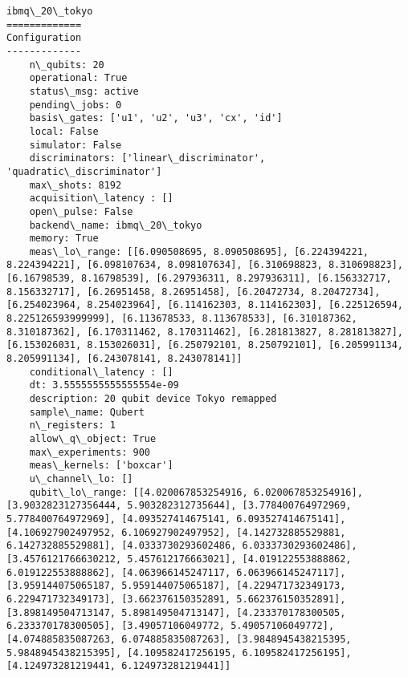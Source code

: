 \documentclass[11pt]{article}
\begin{document}
    \begin{Verbatim}[commandchars=\\\{\}]
ibmq\_20\_tokyo
=============
Configuration
-------------
    n\_qubits: 20
    operational: True
    status\_msg: active
    pending\_jobs: 0
    basis\_gates: ['u1', 'u2', 'u3', 'cx', 'id']
    local: False
    simulator: False
    discriminators: ['linear\_discriminator', 'quadratic\_discriminator']
    max\_shots: 8192
    acquisition\_latency : []
    open\_pulse: False
    backend\_name: ibmq\_20\_tokyo
    memory: True
    meas\_lo\_range: [[6.090508695, 8.090508695], [6.224394221, 8.224394221], [6.098107634, 8.098107634], [6.310698823, 8.310698823], [6.16798539, 8.16798539], [6.297936311, 8.297936311], [6.156332717, 8.156332717], [6.26951458, 8.26951458], [6.20472734, 8.20472734], [6.254023964, 8.254023964], [6.114162303, 8.114162303], [6.225126594, 8.225126593999999], [6.113678533, 8.113678533], [6.310187362, 8.310187362], [6.170311462, 8.170311462], [6.281813827, 8.281813827], [6.153026031, 8.153026031], [6.250792101, 8.250792101], [6.205991134, 8.205991134], [6.243078141, 8.243078141]]
    conditional\_latency : []
    dt: 3.5555555555555554e-09
    description: 20 qubit device Tokyo remapped
    sample\_name: Qubert
    n\_registers: 1
    allow\_q\_object: True
    max\_experiments: 900
    meas\_kernels: ['boxcar']
    u\_channel\_lo: []
    qubit\_lo\_range: [[4.020067853254916, 6.020067853254916], [3.9032823127356444, 5.903282312735644], [3.778400764972969, 5.778400764972969], [4.093527414675141, 6.093527414675141], [4.106927902497952, 6.106927902497952], [4.142732885529881, 6.142732885529881], [4.0333730293602486, 6.0333730293602486], [3.4576121766630212, 5.457612176663021], [4.019122553888862, 6.019122553888862], [4.063966145247117, 6.063966145247117], [3.959144075065187, 5.959144075065187], [4.229471732349173, 6.229471732349173], [3.662376150352891, 5.662376150352891], [3.898149504713147, 5.898149504713147], [4.233370178300505, 6.233370178300505], [3.49057106049772, 5.49057106049772], [4.074885835087263, 6.074885835087263], [3.9848945438215395, 5.9848945438215395], [4.109582417256195, 6.109582417256195], [4.124973281219441, 6.124973281219441]]

\end{Verbatim}
\end{document}
